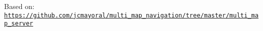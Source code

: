 Based on\+: \href{https://github.com/jcmayoral/multi_map_navigation/tree/master/multi_map_server}{\tt https\+://github.\+com/jcmayoral/multi\+\_\+map\+\_\+navigation/tree/master/multi\+\_\+map\+\_\+server} 